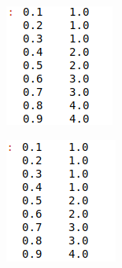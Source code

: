 \documentclass[11pt]{article}
\begin{document}
\begin{figure}[h!]
  \captionsetup{justification=centering}
  \centering
  \begin{subfigure}[b]{0.2\linewidth}
    \includegraphics[width=\linewidth]{le3_perc.png}
  \end{subfigure}
  \hspace{30mm}
  \begin{subfigure}[b]{0.2\linewidth}
    \includegraphics[width=\linewidth]{gt3_perc.png}

\end{subfigure}
\end{figure}
\end{document}

